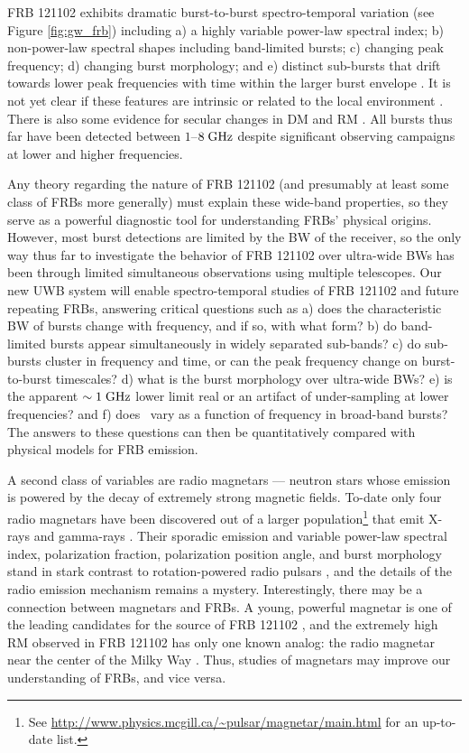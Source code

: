 \documentclass[10pt]{myNSF}
\begin{document}
FRB 121102 exhibits dramatic burst-to-burst spectro-temporal variation
(see Figure \ref{fig:gw_frb}) including a) a highly variable power-law
spectral index; b) non-power-law spectral shapes including
band-limited bursts; c) changing peak frequency; d) changing burst
morphology; and e) distinct sub-bursts that drift towards lower peak
frequencies with time within the larger burst envelope
\citep{ssh+16a,ssh+16b,gsp+18}.  It is not yet clear if these features
are intrinsic or related to the local environment
\citep[e.g.][]{cwh+17,myc+18}.  There is also some evidence for
secular changes in DM and RM \citep{msh+18,gsp+18}.  All bursts thus
far have been detected between $1$--$8\; \textrm{GHz}$ despite significant
observing campaigns at lower and higher frequencies.

Any theory regarding the nature of FRB 121102 (and presumably at least
some class of FRBs more generally) must explain these wide-band
properties, so they serve as a powerful diagnostic tool for
understanding FRBs' physical origins.  However, most burst detections
are limited by the BW of the receiver, so the only way thus far to
investigate the behavior of FRB 121102 over ultra-wide BWs has been
through limited simultaneous observations using multiple telescopes.
Our new UWB system will enable spectro-temporal studies of FRB 121102
and future repeating FRBs, answering critical questions such as a)
does the characteristic BW of bursts change with frequency, and if so,
with what form? b) do band-limited bursts appear simultaneously in
widely separated sub-bands? c) do sub-bursts cluster in frequency and
time, or can the peak frequency change on burst-to-burst timescales?
d) what is the burst morphology over ultra-wide BWs? e) is the
apparent $\sim 1\; \textrm{GHz}$ lower limit real or an artifact of
under-sampling at lower frequencies? and f) does \DM\ vary as a
function of frequency in broad-band bursts?  The answers to these
questions can then be quantitatively compared with physical models for
FRB emission.

A second class of variables are radio magnetars --- neutron stars
whose emission is powered by the decay of extremely strong magnetic
fields.  To-date only four radio magnetars have been discovered out of
a larger population\footnote{See
  \url{http://www.physics.mcgill.ca/~pulsar/magnetar/main.html} for an
  up-to-date list.} that emit X-rays and gamma-rays
\citep{crh+06,crh+07,lbb+10,efk+13}.  Their sporadic emission and
variable power-law spectral index, polarization fraction, polarization
position angle, and burst morphology stand in stark contrast to
rotation-powered radio pulsars \citep[e.g.][]{crp+07}, and the details
of the radio emission mechanism remains a mystery.  Interestingly,
there may be a connection between magnetars and FRBs.  A young,
powerful magnetar is one of the leading candidates for the source of
FRB 121102 \citep[e.g.][]{mm18}, and the extremely high RM observed in
FRB 121102 has only one known analog: the radio magnetar near the
center of the Milky Way \citep{efk+13}.  Thus, studies of magnetars
may improve our understanding of FRBs, and vice versa.
\end{document}

